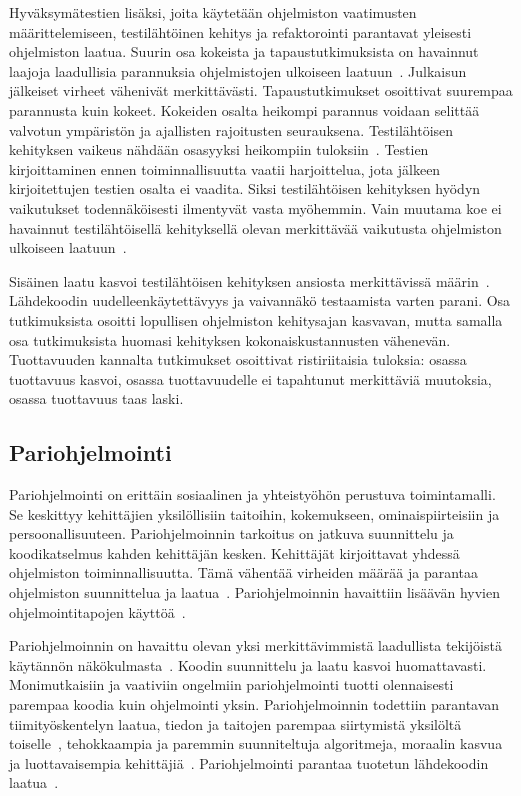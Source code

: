 \documentclass[finnish]{../tktltiki2}
\theoremstyle{definition}
\theoremstyle{remark}
\begin{document}
    Hyväksymätestien lisäksi, joita käytetään ohjelmiston vaatimusten määrit\-telemiseen, testilähtöinen kehitys ja 
refaktorointi parantavat yleisesti ohjelmiston laatua. Suurin osa kokeista ja tapaustutkimuksista on havainnut laajoja 
laadullisia parannuksia ohjelmistojen ulkoiseen laatuun~\cite{SS10}. Julkaisun jälkeiset virheet vähenivät 
merkittävästi. Tapaustutkimukset osoittivat suurempaa parannusta kuin kokeet. Kokeiden osalta heikompi parannus voidaan 
selittää valvotun ympäristön ja ajallisten rajoitusten seurauksena. Testilähtöisen kehityksen vaikeus nähdään osasyyksi 
heikompiin tuloksiin~\cite{PC11}. Testien kirjoittaminen ennen toiminnallisuutta vaatii harjoittelua, jota jälkeen 
kirjoitettujen testien osalta ei vaadita. Siksi testilähtöisen kehityksen hyödyn vaikutukset todennäköisesti ilmentyvät 
vasta myöhemmin. Vain muutama koe ei havainnut testilähtöisellä kehityksellä olevan merkittävää vaikutusta ohjelmiston 
ulkoiseen laatuun~\cite{SS10}.

    Sisäinen laatu kasvoi testilähtöisen kehityksen ansiosta merkittävissä määrin~\cite{SS10}. Lähdekoodin 
uudelleenkäytettävyys ja vaivannäkö testaamista varten parani. Osa tutkimuksista osoitti lopullisen ohjelmiston 
kehitysajan kasvavan, mutta samalla osa tutkimuksista huomasi kehityksen kokonaiskustannusten vähenevän. Tuottavuuden 
kannalta tutkimukset osoittivat ristiriitaisia tuloksia: osassa tuottavuus kasvoi, osassa tuottavuudelle ei tapahtunut 
merkittäviä muutoksia, osassa tuottavuus taas laski.

\subsection{Pariohjelmointi}

Pariohjelmointi on erittäin sosiaalinen ja yhteistyöhön perustuva toimintamalli. Se keskittyy kehittäjien yksilöllisiin 
taitoihin, kokemukseen, ominaispiirteisiin ja persoonallisuuteen. Pariohjelmoinnin tarkoitus on jatkuva suunnittelu ja 
koodikatselmus kahden kehittäjän kesken. Kehittäjät kirjoittavat yhdessä ohjelmiston toiminnallisuutta. Tämä vähentää 
virheiden määrää ja parantaa ohjelmiston suunnittelua ja laatua~\cite{SS10}. Pariohjelmoinnin havaittiin lisäävän hyvien 
ohjelmointitapojen käyttöä~\cite{DD08}.

    Pariohjelmoinnin on havaittu olevan yksi merkittävimmistä laadullista tekijöistä käytännön näkökulmasta~\cite{SS10}. 
Koodin suunnittelu ja laatu kasvoi huomattavasti. Monimutkaisiin ja vaativiin ongelmiin pariohjelmointi tuotti 
olennaisesti parempaa koodia kuin ohjelmointi yksin. Pariohjelmoinnin todettiin parantavan tiimityöskentelyn laatua, 
tiedon ja taitojen parempaa siirtymistä yksilöltä toiselle~\cite{DD08, SS10}, tehokkaampia ja paremmin suunniteltuja 
algoritmeja, moraalin kasvua ja luottavaisempia kehittäjiä~\cite{SS10}. Pariohjelmointi parantaa tuotetun lähdekoodin 
laatua~\cite{DD08}.
\end{document}
